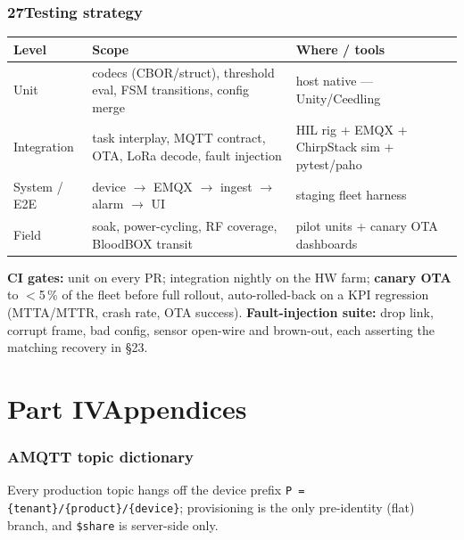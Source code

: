 \section*{27\quad Testing strategy}
\begin{center}
\renewcommand{\arraystretch}{1.18}\small
\begin{tabularx}{\textwidth}{@{}l X l@{}}
\toprule
\textbf{Level} & \textbf{Scope} & \textbf{Where / tools} \\
\midrule
Unit & codecs (CBOR/struct), threshold eval, FSM transitions, config merge & host native — Unity/Ceedling \\
Integration & task interplay, MQTT contract, OTA, LoRa decode, fault injection & HIL rig + EMQX + ChirpStack sim + pytest/paho \\
System / E2E & device $\to$ EMQX $\to$ ingest $\to$ alarm $\to$ UI & staging fleet harness \\
Field & soak, power-cycling, RF coverage, BloodBOX transit & pilot units + canary OTA dashboards \\
\bottomrule
\end{tabularx}
\end{center}
\noindent\textbf{CI gates:} unit on every PR; integration nightly on the HW farm; \textbf{canary OTA} to
$<$5\,\% of the fleet before full rollout, auto-rolled-back on a KPI regression (MTTA/MTTR, crash rate,
OTA success). \textbf{Fault-injection suite:} drop link, corrupt frame, bad config, sensor open-wire and
brown-out, each asserting the matching recovery in \S23.

\part*{Part IV\quad Appendices}

\section*{A\quad MQTT topic dictionary}
Every production topic hangs off the device prefix \texttt{P = \{tenant\}/\{product\}/\{device\}};
provisioning is the only pre-identity (flat) branch, and \texttt{\$share} is server-side only.

